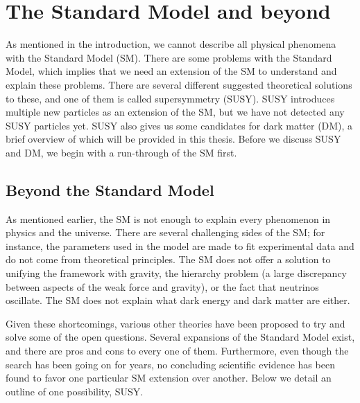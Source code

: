 \chapter{The Standard Model and beyond}
\label{sec:Theory}
As mentioned in the introduction, we cannot describe all physical phenomena with the Standard Model (SM). There are some problems with the Standard Model, which implies that we need an extension of the SM to understand and explain these problems. There are several different suggested theoretical solutions to these, and one of them is called supersymmetry (SUSY). SUSY introduces multiple new particles as an extension of the SM, but we have not detected any SUSY particles yet. SUSY also gives us some candidates for dark matter (DM), a brief overview of which will be provided in this thesis. Before we discuss SUSY and DM, we begin with a run-through of the SM first.



\section{Beyond the Standard Model}
As mentioned earlier, the SM is not enough to explain every phenomenon in physics and the universe. There are several challenging sides of the SM; for instance, the parameters used in the model are made to fit experimental data and do not come from theoretical principles. 
The SM does not offer a solution to unifying the framework with gravity, the hierarchy problem (a large discrepancy between aspects of the weak force and gravity), or the fact that neutrinos oscillate. The SM does not explain what dark energy and dark matter are either.  

Given these shortcomings, various other theories have been proposed to try and solve some of the open questions. Several expansions of the Standard Model exist, and there are pros and cons to every one of them. Furthermore, even though the search has been going on for years, no concluding scientific evidence has been found to favor one particular SM extension over another. Below we detail an outline of one possibility, SUSY.



